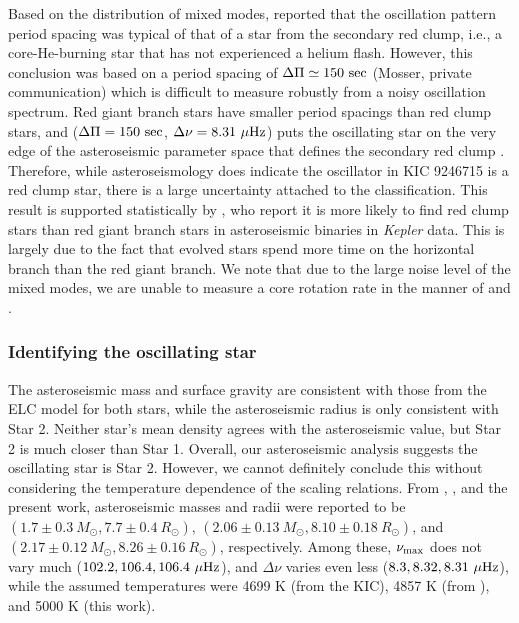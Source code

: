 Based on the distribution of mixed modes, \citet{gau14} reported that the oscillation pattern period spacing was typical of that of a star from the secondary red clump, i.e., a core-He-burning star that has not experienced a helium flash. However, this conclusion was based on a period spacing of $\Delta \Pi \simeq 150 \ \rm{sec}$ (Mosser, private communication) which is difficult to measure robustly from a noisy oscillation spectrum. Red giant branch stars have smaller period spacings than red clump stars, and ($\Delta \Pi = 150 \ \rm{sec}$, $\Delta \nu = 8.31 \ \mu \rm{Hz}$) puts the oscillating star on the very edge of the asteroseismic parameter space that defines the secondary red clump \citep{mos14}. Therefore, while asteroseismology does indicate the oscillator in KIC 9246715 is a red clump star, there is a large uncertainty attached to the classification. This result is supported statistically by \citet{mig14}, who report it is more likely to find red clump stars than red giant branch stars in asteroseismic binaries in \emph{Kepler} data. This is largely due to the fact that evolved stars spend more time on the horizontal branch than the red giant branch. We note that due to the large noise level of the mixed modes, we are unable to measure a core rotation rate in the manner of \citet{bec12} and \citet{mos12}.

\subsubsection{Identifying the oscillating star}
The asteroseismic mass and surface gravity are consistent with those from the ELC model for both stars, while the asteroseismic radius is only consistent with Star 2. Neither star's mean density agrees with the asteroseismic value, but Star 2 is much closer than Star 1. Overall, our asteroseismic analysis suggests the oscillating star is Star 2. However, we cannot definitely conclude this without considering the temperature dependence of the scaling relations. From \citet{gau13}, \citet{gau14}, and the present work, asteroseismic masses and radii were reported to be $(1.7 \pm 0.3 \ M_\odot, 7.7 \pm 0.4 \ R_\odot)$, $(2.06 \pm 0.13 \ M_\odot, 8.10 \pm 0.18 \ R_\odot)$, and $(2.17 \pm 0.12 \ M_\odot, 8.26 \pm 0.16 \ R_\odot)$, respectively. Among these, $\nu_{\rm{max}}$ does not vary much ($102.2, 106.4, 106.4 \ \mu\rm{Hz}$), and $\Delta \nu$ varies even less ($8.3, 8.32, 8.31 \ \mu\rm{Hz}$), while the assumed temperatures were 4699 K (from the KIC), 4857 K (from \citealt{hub14.2}), and 5000 K (this work).

